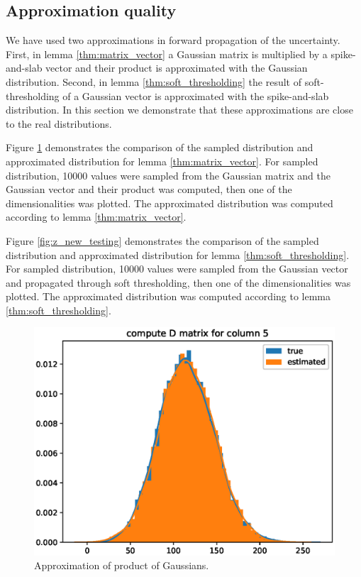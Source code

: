 \documentclass[letterpaper]{article}
\begin{document}
\subsection{Approximation quality}
\label{sec:approx_quality}
We have used two approximations in forward propagation of the uncertainty. First, in lemma \ref{thm:matrix_vector} a Gaussian matrix is multiplied by a spike-and-slab vector and their product is approximated with the Gaussian distribution. Second, in lemma \ref{thm:soft_thresholding} the result of soft-thresholding of a Gaussian vector is approximated with the spike-and-slab distribution. In this section we demonstrate that these approximations are close to the real distributions.

Figure \ref{fig:d_testing} demonstrates the comparison of the sampled distribution and approximated distribution for lemma \ref{thm:matrix_vector}. For sampled distribution, 10000 values were sampled from the Gaussian matrix and the Gaussian vector and their product was computed, then one of the dimensionalities was plotted. The approximated distribution was computed according to lemma \ref{thm:matrix_vector}.

Figure \ref{fig:z_new_testing} demonstrates the comparison of the sampled distribution and approximated distribution for lemma \ref{thm:soft_thresholding}. For sampled distribution, 10000 values were sampled from the Gaussian vector and propagated through soft thresholding, then one of the dimensionalities was plotted. The approximated distribution was computed according to lemma \ref{thm:soft_thresholding}.
\begin{figure}[t]
\includegraphics[width=\columnwidth]{d_testing}
\caption{Approximation of product of Gaussians.}
\label{fig:d_testing}
\end{figure}
\end{document}
